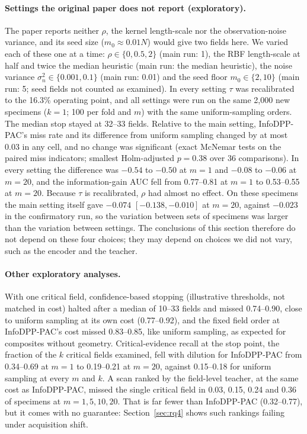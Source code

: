 \documentclass[11pt]{article}
\theoremstyle{remark}
\theoremstyle{definition}
\begin{document}
\paragraph{Settings the original paper does not report (exploratory).} The paper reports neither $\rho$, the kernel length-scale nor the observation-noise variance, and its seed size ($m_0\approx0.01N$) would give two fields here. We varied each of these one at a time: $\rho\in\{0,0.5,2\}$ (main run: 1), the RBF length-scale at half and twice the median heuristic (main run: the median heuristic), the noise variance $\sigma_n^2\in\{0.001,0.1\}$ (main run: 0.01) and the seed floor $m_0\in\{2,10\}$ (main run: 5; seed fields not counted as examined). In every setting $\tau$ was recalibrated to the 16.3\% operating point, and all settings were run on the same 2,000 new specimens ($k=1$; 100 per fold and $m$) with the same uniform-sampling orders. The median stop stayed at 32--33 fields. Relative to the main setting, InfoDPP-PAC's miss rate and its difference from uniform sampling changed by at most 0.03 in any cell, and no change was significant (exact McNemar tests on the paired miss indicators; smallest Holm-adjusted $p=0.38$ over 36 comparisons). In every setting the difference was $-0.54$ to $-0.50$ at $m=1$ and $-0.08$ to $-0.06$ at $m=20$, and the information-gain AUC fell from 0.77--0.81 at $m=1$ to 0.53--0.55 at $m=20$. Because $\tau$ is recalibrated, $\rho$ had almost no effect. On these specimens the main setting itself gave $-0.074$ $[-0.138,-0.010]$ at $m=20$, against $-0.023$ in the confirmatory run, so the variation between sets of specimens was larger than the variation between settings. The conclusions of this section therefore do not depend on these four choices; they may depend on choices we did not vary, such as the encoder and the teacher.

\paragraph{Other exploratory analyses.} With one critical field, confidence-based stopping (illustrative thresholds, not matched in cost) halted after a median of 10--33 fields and missed 0.74--0.90, close to uniform sampling at its own cost (0.77--0.92), and the fixed field order at InfoDPP-PAC's cost missed 0.83--0.85, like uniform sampling, as expected for composites without geometry. Critical-evidence recall at the stop point, the fraction of the $k$ critical fields examined, fell with dilution for InfoDPP-PAC from 0.34--0.69 at $m=1$ to 0.19--0.21 at $m=20$, against 0.15--0.18 for uniform sampling at every $m$ and $k$. A scan ranked by the field-level teacher, at the same cost as InfoDPP-PAC, missed the single critical field in 0.03, 0.15, 0.24 and 0.36 of specimens at $m=1,5,10,20$. That is far fewer than InfoDPP-PAC (0.32--0.77), but it comes with no guarantee: Section~\ref{sec:rq4} shows such rankings failing under acquisition shift.
\end{document}
